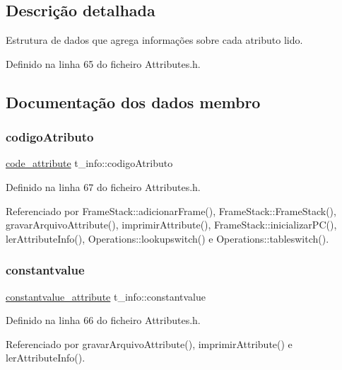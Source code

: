 \subsection{Descrição detalhada}
Estrutura de dados que agrega informações sobre cada atributo lido. 

Definido na linha 65 do ficheiro Attributes.\+h.



\subsection{Documentação dos dados membro}
\mbox{\label{uniont__info_ad6e1a8b8fb7d8ded498685b35fbdc7fe}} 
\subsubsection{\texorpdfstring{codigo\+Atributo}{codigoAtributo}}
{\footnotesize\ttfamily \hyperlink{structcode__attribute}{code\+\_\+attribute} t\+\_\+info\+::codigo\+Atributo}



Definido na linha 67 do ficheiro Attributes.\+h.



Referenciado por Frame\+Stack\+::adicionar\+Frame(), Frame\+Stack\+::\+Frame\+Stack(), gravar\+Arquivo\+Attribute(), imprimir\+Attribute(), Frame\+Stack\+::inicializar\+P\+C(), ler\+Attribute\+Info(), Operations\+::lookupswitch() e Operations\+::tableswitch().

\mbox{\label{uniont__info_ab4a27f0438794e6a65bbdd9776fe657a}} 
\subsubsection{\texorpdfstring{constantvalue}{constantvalue}}
{\footnotesize\ttfamily \hyperlink{structconstantvalue__attribute}{constantvalue\+\_\+attribute} t\+\_\+info\+::constantvalue}



Definido na linha 66 do ficheiro Attributes.\+h.



Referenciado por gravar\+Arquivo\+Attribute(), imprimir\+Attribute() e ler\+Attribute\+Info().

